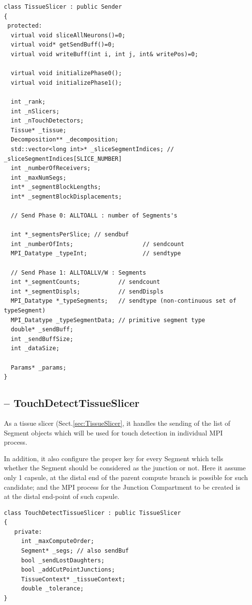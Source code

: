 
\begin{verbatim}
class TissueSlicer : public Sender
{
 protected:
  virtual void sliceAllNeurons()=0;
  virtual void* getSendBuff()=0;
  virtual void writeBuff(int i, int j, int& writePos)=0;

  virtual void initializePhase0();
  virtual void initializePhase1();
  
  int _rank;
  int _nSlicers;
  int _nTouchDetectors;  
  Tissue* _tissue;
  Decomposition** _decomposition;
  std::vector<long int>* _sliceSegmentIndices; // _sliceSegmentIndices[SLICE_NUMBER] 
  int _numberOfReceivers;
  int _maxNumSegs;
  int* _segmentBlockLengths;
  int* _segmentBlockDisplacements;

  // Send Phase 0: ALLTOALL : number of Segments's
  
  int *_segmentsPerSlice; // sendbuf
  int _numberOfInts;                    // sendcount
  MPI_Datatype _typeInt;                // sendtype

  // Send Phase 1: ALLTOALLV/W : Segments
  int *_segmentCounts;           // sendcount
  int *_segmentDispls;           // sendDispls
  MPI_Datatype *_typeSegments;   // sendtype (non-continuous set of typeSegment)
  MPI_Datatype _typeSegmentData; // primitive segment type
  double* _sendBuff;
  int _sendBuffSize;
  int _dataSize;

  Params* _params;
}
\end{verbatim}

\subsection{-- TouchDetectTissueSlicer}
\label{sec:TouchDetectTissueSlicer}

As a tissue slicer (Sect.\ref{sec:TissueSlicer}, it handles the sending of the
list of Segment objects which will be used for touch detection in individual MPI
process.

In addition, it also configure the proper key for every Segment which tells
whether the Segment should be considered as the junction or not. Here it assume
only 1 capsule, at the distal end of the parent compute branch is possible for
such candidate; and the MPI process for the Junction Compartment to be created
is at the distal end-point of such capsule.





\begin{verbatim}
class TouchDetectTissueSlicer : public TissueSlicer
{
   private:
     int _maxComputeOrder;
     Segment* _segs; // also sendBuf
     bool _sendLostDaughters;
     bool _addCutPointJunctions;
     TissueContext* _tissueContext;
     double _tolerance;
}
\end{verbatim}

